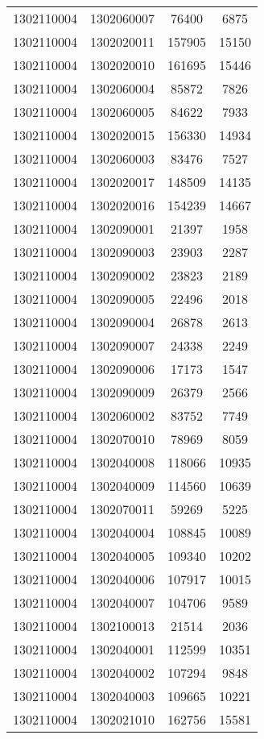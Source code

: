 \begin{longtable}[h]{llcc}
		1302110004 & 1302060007 & 76400 & 6875\\
		1302110004 & 1302020011 & 157905 & 15150\\
		1302110004 & 1302020010 & 161695 & 15446\\
		1302110004 & 1302060004 & 85872 & 7826\\
		1302110004 & 1302060005 & 84622 & 7933\\
		1302110004 & 1302020015 & 156330 & 14934\\
		1302110004 & 1302060003 & 83476 & 7527\\
		1302110004 & 1302020017 & 148509 & 14135\\
		1302110004 & 1302020016 & 154239 & 14667\\
		1302110004 & 1302090001 & 21397 & 1958\\
		1302110004 & 1302090003 & 23903 & 2287\\
		1302110004 & 1302090002 & 23823 & 2189\\
		1302110004 & 1302090005 & 22496 & 2018\\
		1302110004 & 1302090004 & 26878 & 2613\\
		1302110004 & 1302090007 & 24338 & 2249\\
		1302110004 & 1302090006 & 17173 & 1547\\
		1302110004 & 1302090009 & 26379 & 2566\\
		1302110004 & 1302060002 & 83752 & 7749\\
		1302110004 & 1302070010 & 78969 & 8059\\
		1302110004 & 1302040008 & 118066 & 10935\\
		1302110004 & 1302040009 & 114560 & 10639\\
		1302110004 & 1302070011 & 59269 & 5225\\
		1302110004 & 1302040004 & 108845 & 10089\\
		1302110004 & 1302040005 & 109340 & 10202\\
		1302110004 & 1302040006 & 107917 & 10015\\
		1302110004 & 1302040007 & 104706 & 9589\\
		1302110004 & 1302100013 & 21514 & 2036\\
		1302110004 & 1302040001 & 112599 & 10351\\
		1302110004 & 1302040002 & 107294 & 9848\\
		1302110004 & 1302040003 & 109665 & 10221\\
		1302110004 & 1302021010 & 162756 & 15581\\

\end{longtable}
